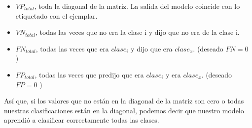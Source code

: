 \begin{description}
   \begin{itemize}
     \item \emph{$VP_{total}$}, toda la diagonal de la matriz. La salida del modelo coincide con lo etiquetado con el ejemplar.
     \item \emph{$VN_{total}$}, todas las veces que no era la clase i y dijo que no era de la clase i.
     \item \emph{$FN_{total}$}, todas las veces que era $clase_{i}$ y dijo que era $clase_{x}$. (deseado $FN = 0$ )
     \item \emph{$FP_{total}$}, todas las veces que predijo que era $clase_{i}$ y era $clase_{x}$. (deseado $FP = 0$ )
   \end{itemize}
 
    Así que, si los valores que no están en la diagonal de la matriz son cero o todas nuestras clasificaciones están en la diagonal, podemos decir que nuestro modelo aprendió a clasificar correctamente todas las clases.
 
 \end{description}
